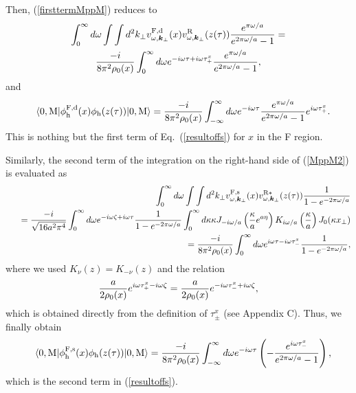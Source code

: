 \documentclass[aps,prd,preprintnumbers,nofootinbib,showpacs,11pt]{revtex4}%
\begin{document}
\begin{widetext}
Then, (\ref{firsttermMppM}) %
reduces to 
\begin{multline}
\int_0^{\infty}d\omega\int\int d^2k_\perp
v_{\omega,\bm k_\perp}^{\rm F,d}(x)v_{\omega,\bm k_\perp}^{\rm R}(z(\tau))
{e^{\pi\omega/a}\over e^{2\pi\omega/a}-1}
=\\
{-i\over 8\pi^2\rho_0(x)}\int_0^\infty d\omega e^{-i\omega\tau +i\omega\tau_+^{x}}
{e^{\pi\omega/a}\over e^{2\pi\omega/a}-1},
\label{firsttermMppMA}
\end{multline}
and 
\begin{eqnarray}
&&\langle0,{\rm M}|\phi_{\rm h}^{\rm F,d}(x) \phi_{\rm h}(z(\tau))|0,{\rm M}\rangle
={-i\over 8\pi^2\rho_0(x)}\int_{-\infty}^{\infty} d\omega e^{-i\omega\tau}
{e^{\pi\omega/a}\over e^{2\pi\omega/a}-1}e^{i\omega\tau_+^{x}}.
\end{eqnarray}
This is nothing but the first term of Eq.~(\ref{resultoffs}) for $x$ in the F region. 


Similarly, the second term of the integration on the right-hand side of (\ref{MppM2}) is 
evaluated as 
\begin{eqnarray}
&&\int_0^{\infty}d\omega\int\int d^2k_\perp
v_{\omega,\bm k_\perp}^{\rm F,s}(x)v_{\omega,\bm k_\perp}^{\rm R*}(z(\tau))
{1\over 1-e^{-2\pi\omega/a}}
\nonumber\\
&&~~={-i\over \sqrt{16 a^2\pi^4}}\int_0^{\infty}d\omega e^{-i\omega\zeta+i\omega\tau}
{1\over 1-e^{-2\pi\omega/a}} \int_0^\infty d\kappa \kappa J_{-i\omega/a}\left({\kappa\over a}e^{a\eta}\right)
K_{i\omega/a}\left({\kappa\over a}\right) J_0(\kappa x_\perp)
\nonumber\\
&&~~={-i\over 8\pi^2\rho_0(x)}\int_0^\infty d\omega e^{i\omega\tau -i\omega\tau_-^{x}}
{1\over 1-e^{-2\pi\omega/a}},
\label{firsttermMppMD}
\end{eqnarray}
where we used $K_\nu(z)=K_{-\nu}(z)$ and the relation
\begin{eqnarray}
{a\over 2\rho_0(x)}e^{i\omega\tau_+^{x}-i\omega\zeta}
={a\over 2\rho_0(x)}e^{-i\omega\tau_-^{x}+i\omega\zeta},
\label{arhoarho}
\end{eqnarray}
which is obtained directly from the definition of $\tau_\pm^x$ (see Appendix C).
Thus, we finally obtain
\begin{eqnarray}
&&\langle0,{\rm M}|\phi_{\rm h}^{\rm F,s}(x) \phi_{\rm h}(z(\tau))|0,{\rm M}\rangle
={-i\over 8\pi^2\rho_0(x)}\int_{-\infty}^{\infty} d\omega e^{-i\omega\tau}\left(
-{e^{i\omega\tau_-^{x}}\over e^{2\pi\omega/a}-1}
\right),
\end{eqnarray}
which is the second term in (\ref{resultoffs}). 



\end{widetext}
\end{document}
